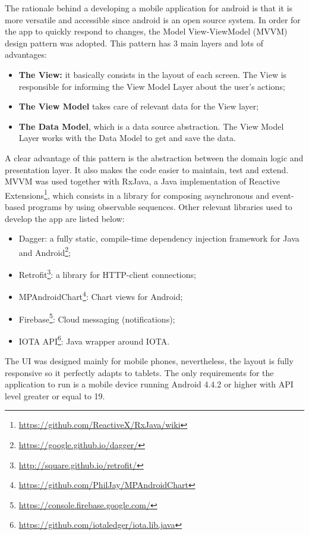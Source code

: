 The rationale behind a developing a mobile application for android is that it is  more versatile and accessible since android is an open source system. In order for the app to quickly respond to changes, the Model View-ViewModel (MVVM) design pattern was adopted. This pattern has 3 main layers and lots of advantages:
\begin{itemize}
    \item \textbf{The View:} it basically consists in the layout of each screen. The View is responsible for informing the View Model Layer about the user’s actions;
    \item \textbf{The View Model} takes care of relevant data for the View layer;
    \item \textbf{The Data Model}, which is a data source abstraction. The View Model Layer works with the Data Model to get and save the data. 
\end{itemize}

A clear advantage of this pattern is the abstraction between the domain logic and presentation layer. It also makes the code easier to maintain, test and extend. \ac{MVVM} was used together with RxJava, a Java implementation of Reactive Extensions\footnote{\url{https://github.com/ReactiveX/RxJava/wiki}}, which consists in a library for composing asynchronous and event-based programs by using observable sequences.
Other relevant libraries used to develop the app are listed below:
\begin{itemize}
    \item Dagger: a fully static, compile-time dependency injection framework for Java and Android\footnote{\url{https://google.github.io/dagger/}};
    \item Retrofit\footnote{\url{http://square.github.io/retrofit/}}: a library for HTTP-client connections;
    \item MPAndroidChart\footnote{\url{https://github.com/PhilJay/MPAndroidChart}}: Chart views for Android;
    \item Firebase\footnote{\url{https://console.firebase.google.com/}}: Cloud messaging (notifications);
    \item IOTA API\footnote{\url{ https://github.com/iotaledger/iota.lib.java}}: Java wrapper around IOTA.
\end{itemize}


The \ac{UI} was designed mainly for mobile phones, nevertheless, the layout is fully responsive so it perfectly adapts to tablets. The only requirements for the application to run is a mobile device running Android 4.4.2 or higher with \ac{API} level greater or equal to 19. 



